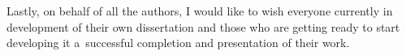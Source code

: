 Lastly, on behalf of all the authors, I would like to wish everyone currently in development of their own dissertation and those who are getting ready to start developing it a~successful completion and presentation of their work.


% 